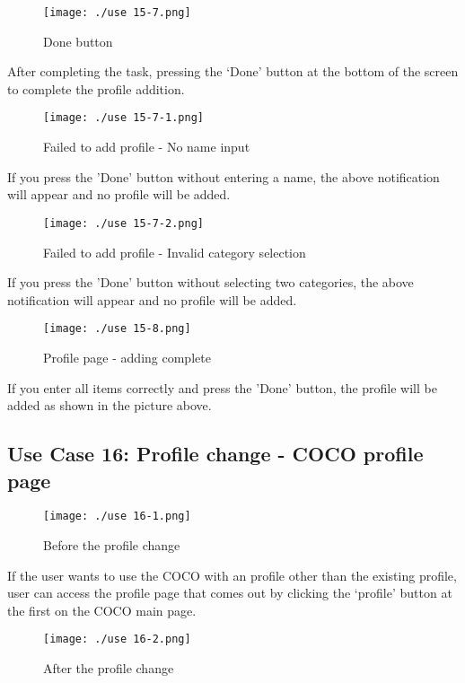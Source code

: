 \documentclass[conference]{IEEEtran}
\begin{document}
\begin{figure}[H]
\texttt{[image: ./use 15-7.png]}
\centering
\caption{Done button}
\end{figure}

After completing the task, pressing the ‘Done' button at the bottom of the screen to complete the profile addition.

\begin{figure}[H]
\texttt{[image: ./use 15-7-1.png]}
\centering
\caption{Failed to add profile - No name input}
\end{figure}

If you press the 'Done' button without entering a name, the above notification will appear and no profile will be added.


\begin{figure}[H]
\texttt{[image: ./use 15-7-2.png]}
\centering
\caption{Failed to add profile - Invalid category selection}
\end{figure}

If you press the 'Done' button without selecting two categories, the above notification will appear and no profile will be added.

\begin{figure}[H]
\texttt{[image: ./use 15-8.png]}
\centering
\caption{Profile page - adding complete}
\end{figure}

If you enter all items correctly and press the 'Done' button, the profile will be added as shown in the picture above.

\subsection{Use Case 16: Profile change - COCO profile page}

\begin{figure}[H]
\texttt{[image: ./use 16-1.png]}
\centering
\caption{Before the profile change}
\end{figure}

If the user wants to use the COCO with an profile other than the existing profile, user can access the profile page that comes out by clicking the ‘profile' button at the first on the COCO main page.

\begin{figure}[H]
\texttt{[image: ./use 16-2.png]}
\centering
\caption{After the profile change}
\end{figure}
\end{document}
